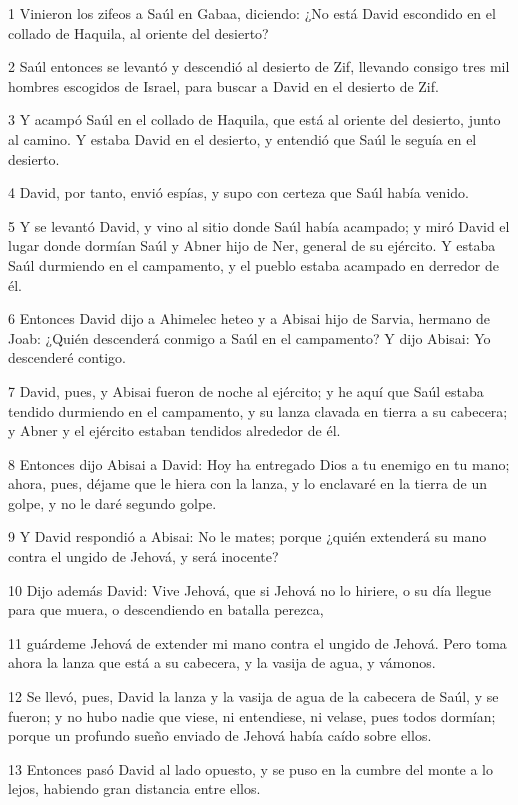 \par 1 Vinieron los zifeos a Saúl en Gabaa, diciendo: ¿No está David escondido en el collado de Haquila, al oriente del desierto? 
\par 2 Saúl entonces se levantó y descendió al desierto de Zif, llevando consigo tres mil hombres escogidos de Israel, para buscar a David en el desierto de Zif.
\par 3 Y acampó Saúl en el collado de Haquila, que está al oriente del desierto, junto al camino. Y estaba David en el desierto, y entendió que Saúl le seguía en el desierto.
\par 4 David, por tanto, envió espías, y supo con certeza que Saúl había venido.
\par 5 Y se levantó David, y vino al sitio donde Saúl había acampado; y miró David el lugar donde dormían Saúl y Abner hijo de Ner, general de su ejército. Y estaba Saúl durmiendo en el campamento, y el pueblo estaba acampado en derredor de él.
\par 6 Entonces David dijo a Ahimelec heteo y a Abisai hijo de Sarvia, hermano de Joab: ¿Quién descenderá conmigo a Saúl en el campamento? Y dijo Abisai: Yo descenderé contigo.
\par 7 David, pues, y Abisai fueron de noche al ejército; y he aquí que Saúl estaba tendido durmiendo en el campamento, y su lanza clavada en tierra a su cabecera; y Abner y el ejército estaban tendidos alrededor de él.
\par 8 Entonces dijo Abisai a David: Hoy ha entregado Dios a tu enemigo en tu mano; ahora, pues, déjame que le hiera con la lanza, y lo enclavaré en la tierra de un golpe, y no le daré segundo golpe.
\par 9 Y David respondió a Abisai: No le mates; porque ¿quién extenderá su mano contra el ungido de Jehová, y será inocente?
\par 10 Dijo además David: Vive Jehová, que si Jehová no lo hiriere, o su día llegue para que muera, o descendiendo en batalla perezca,
\par 11 guárdeme Jehová de extender mi mano contra el ungido de Jehová. Pero toma ahora la lanza que está a su cabecera, y la vasija de agua, y vámonos.
\par 12 Se llevó, pues, David la lanza y la vasija de agua de la cabecera de Saúl, y se fueron; y no hubo nadie que viese, ni entendiese, ni velase, pues todos dormían; porque un profundo sueño enviado de Jehová había caído sobre ellos.
\par 13 Entonces pasó David al lado opuesto, y se puso en la cumbre del monte a lo lejos, habiendo gran distancia entre ellos.
